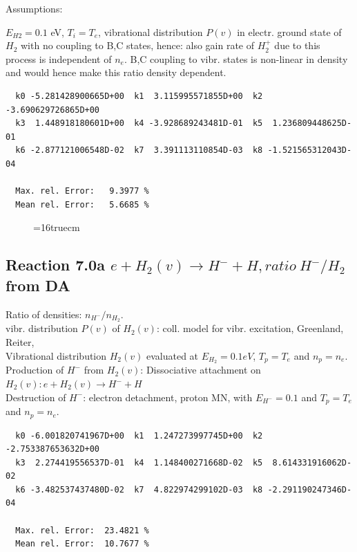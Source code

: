 \documentclass[12pt,dvips]{article}
\begin{document}
Assumptions:

$E_{H2} = 0.1$ eV, $T_i = T_e$, vibrational distribution $P(v)$ in electr. ground state of $H_2$ with
no coupling to B,C states,
hence: also gain rate of $H_2^+$ due to this process is independent of $n_e$.
B,C coupling to vibr. states is non-linear in density and would hence make this ratio density dependent.

\begin{small}\begin{verbatim}
  k0 -5.281428900665D+00  k1  3.115995571855D+00  k2 -3.690629726865D+00
  k3  1.448918180601D+00  k4 -3.928689243481D-01  k5  1.236809448625D-01
  k6 -2.877121006548D-02  k7  3.391113110854D-03  k8 -1.521565312043D-04

  Max. rel. Error:   9.3977 %
  Mean rel. Error:   5.6685 %
\end{verbatim}\end{small}


\begin{figure} \label{2.0a}
\epsfxsize=16truecm
\end{figure}

\newpage

\subsection{
Reaction 7.0a    $ e + H_2(v) \rightarrow H^- + H, ratio \ H^-/H_2$ from DA
}



 Ratio of densities: $n_{H^-}/n_{H_2}$. \\
  vibr. distribution $P(v)$ of $H_2(v)$: coll. model for vibr. excitation, Greenland, Reiter, \cite{kn:Green}\\

  Vibrational distribution $H_2(v)$ evaluated
  at $E_{H_2} = 0.1 eV$, $T_p = T_e$ and $n_p = n_e$.\\
  Production of $H^-$ from $H_2(v)$:  Dissociative attachment on $H_2(v):  e+H_2(v) \rightarrow H^- + H$  \\
  Destruction of $H^-$: electron detachment, proton MN, with $E_{H^-}=0.1$ and $T_p = T_e$ and $n_p = n_e$.

\begin{small}\begin{verbatim}
  k0 -6.001820741967D+00  k1  1.247273997745D+00  k2 -2.753387653632D+00
  k3  2.274419556537D-01  k4  1.148400271668D-02  k5  8.614331916062D-02
  k6 -3.482537437480D-02  k7  4.822974299102D-03  k8 -2.291190247346D-04

  Max. rel. Error:  23.4821 %
  Mean rel. Error:  10.7677 %
\end{verbatim}\end{small}
\end{document}
